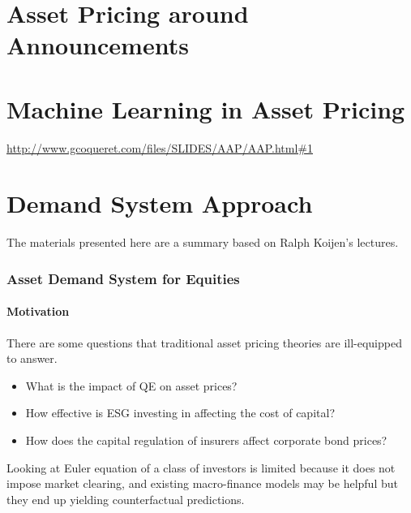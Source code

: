 \documentclass[
]{book}
\providecommand{\tightlist}{%
  \setlength{\itemsep}{0pt}\setlength{\parskip}{0pt}}
\begin{document}
\hypertarget{asset-pricing-around-announcements}{%
\chapter{Asset Pricing around Announcements}\label{asset-pricing-around-announcements}}

\hypertarget{machine-learning-in-asset-pricing}{%
\chapter{Machine Learning in Asset Pricing}\label{machine-learning-in-asset-pricing}}

\url{http://www.gcoqueret.com/files/SLIDES/AAP/AAP.html\#1}

\hypertarget{demand-system-approach}{%
\chapter{Demand System Approach}\label{demand-system-approach}}

The materials presented here are a summary based on Ralph Koijen's lectures.

\hypertarget{asset-demand-system-for-equities}{%
\subsection{Asset Demand System for Equities}\label{asset-demand-system-for-equities}}

\hypertarget{motivation}{%
\subsubsection{Motivation}\label{motivation}}

There are some questions that traditional asset pricing theories are ill-equipped to answer.

\begin{itemize}
\tightlist
\item
  What is the impact of QE on asset prices?
\item
  How effective is ESG investing in affecting the cost of capital?
\item
  How does the capital regulation of insurers affect corporate bond prices?
\end{itemize}

Looking at Euler equation of a class of investors is limited because it does not impose market clearing, and existing macro-finance models may be helpful but they end up yielding counterfactual predictions.
\end{document}
